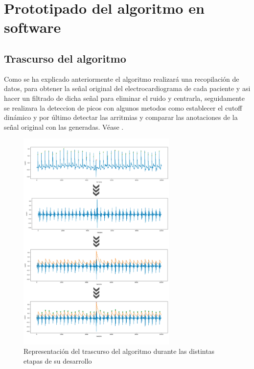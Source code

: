 \chapter{Prototipado del algoritmo en software}

\section{Trascurso del algoritmo}
Como se ha explicado anteriormente el algoritmo realizará una recopilación de datos, para obtener 
la señal original del electrocardiograma de cada paciente y asi hacer un filtrado de dicha señal para eliminar
 el ruido y centrarla, seguidamente se realizara la deteccion de picos con algunos metodos como establecer 
 el cutoff dinámico y por último detectar las arritmias y comparar las anotaciones de la señal original con las generadas.
 Véase
  .

 \FloatBarrier
 \begin{figure}[h!]
    \centering
    \includegraphics[width=0.7\textwidth]{./Images/img_algoritmo/esquemaGeneral.jpg}
    \caption[Representación del trascurso del prototipo]{Representación del trascurso del algoritmo durante las distintas etapas de su desarrollo}
    \label{fig:esquemaGeneral}
\end{figure}

